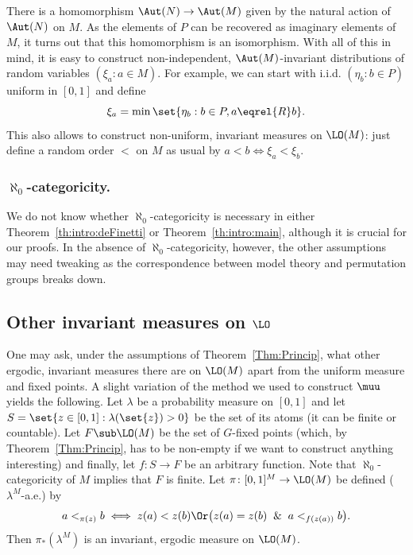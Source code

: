 There is a homomorphism $\Aut(N) \to \Aut(M)$ given by the natural action of $\Aut(N)$ on $M$. As the elements of $P$ can be recovered as imaginary elements of $M$, it turns out that this homomorphism is an isomorphism. With all of this in mind, it is easy to construct non-independent, $\Aut(M)$-invariant distributions of random variables $(\xi_a : a \in M)$. For example, we can start with i.i.d. $(\eta_b : b \in P)$ uniform in $[0, 1]$ and define
\begin{equation*}
\xi_a = \min \set{\eta_b : b \in P, a \eqrel{R} b}.
\end{equation*}
This also allows to construct non-uniform, invariant measures on $\LO(M)$: just define a random order $<$ on $M$ as usual by $a < b \iff \xi_a < \xi_b$.

\subsubsection*{$\aleph_0$-categoricity.} We do not know whether $\aleph_0$-categoricity is necessary in either Theorem~\ref{th:intro:deFinetti} or Theorem~\ref{th:intro:main}, although it is crucial for our proofs. In the absence of $\aleph_0$-categoricity, however, the other assumptions may need tweaking as the correspondence between model theory and permutation groups breaks down.

\subsection{Other invariant measures on $\LO$}
\label{sec:other-invar-meas}

One may ask, under the assumptions of Theorem~\ref{Thm:Princip}, what other ergodic, invariant measures there are on $\LO(M)$ apart from the uniform measure and fixed points. A slight variation of the method we used to construct $\muu$ yields the following. Let $\lambda$ be a probability measure on $[0, 1]$ and let $S = \set{z \in [0, 1] : \lambda(\set{z}) > 0}$ be the set of its atoms (it can be finite or countable). Let $F \sub \LO(M)$ be the set of $G$-fixed points (which, by Theorem~\ref{Thm:Princip}, has to be non-empty if we want to construct anything interesting) and finally, let $f \colon S \to F$ be an arbitrary function. Note that $\aleph_0$-categoricity of $M$ implies that $F$ is finite. Let $\pi \colon [0, 1]^M \to \LO(M)$ be defined ($\lambda^M$-a.e.) by
\begin{equation*}
a <_{\pi(z)} b \iff z(a) < z(b) \Or \big( z(a) = z(b) \And a <_{f(z(a))} b \big).
\end{equation*}
Then $\pi_*(\lambda^M)$ is an invariant, ergodic measure on $\LO(M)$.

